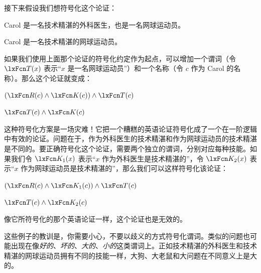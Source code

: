 接下来假设我们想符号化这个论证：


\begin{earg}
\label{surgeon3}
\item Carol 是一名技术精湛的外科医生，也是一名网球运动员。
\item[\texttherefore] Carol 是一名技术精湛的网球运动员。
\end{earg}


如果我们使用上面那个论证的符号化约定作为起点，可以增加一个谓词（令 $\atom{T}{x}$ 表示“$x$ 是一名网球运动员”）和一个名称（令 $c$ 作为 Carol 的名称）。那么这个论证就变成：


\begin{earg}
\item[] $(\atom{R}{c} \eand \atom{K}{c}) \eand \atom{T}{c}$
\item[\texttherefore] $\atom{T}{c} \eand \atom{K}{c}$
\end{earg}


这种符号化方案是一场灾难！它把一个糟糕的英语论证符号化成了一个在一阶逻辑中有效的论证。问题在于，作为外科医生的技术精湛和作为网球运动员的技术精湛是不同的。要正确符号化这个论证，需要两个独立的谓词，分别对应每种技能。如果我们令 $\atom{K_1}{x}$ 表示“$x$ 作为外科医生是技术精湛的”，令 $\atom{K_2}{x}$ 表示“$x$ 作为网球运动员是技术精湛的”，那么我们可以这样符号化该论证：


\begin{earg}
\label{surgeon3correct}
\item[] $(\atom{R}{c} \eand \atom{K_1}{c}) \eand \atom{T}{c}$
\item[\texttherefore] $\atom{T}{c} \eand \atom{K_2}{c}$
\end{earg}


像它所符号化的那个英语论证一样，这个论证也是无效的。%

这些例子的教训是，你需要小心，不要以歧义的方式符号化谓词。类似的问题也可能出现在像\emph{好的}、\emph{坏的}、\emph{大的}、\emph{小的}这类谓词上。正如技术精湛的外科医生和技术精湛的网球运动员拥有不同的技能一样，大狗、大老鼠和大问题在不同意义上是大的。

